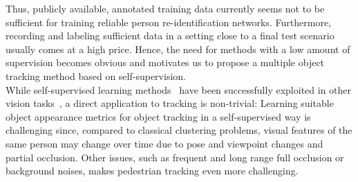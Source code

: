 Thus, publicly available, annotated training data currently seems not to be sufficient for training reliable person re-identification networks. Furthermore, recording and labeling sufficient data in a setting close to a final test scenario usually comes at a high price. Hence, the need for methods with a low amount of supervision becomes obvious and motivates us to propose a multiple object tracking method based on self-supervision.\\
While self-supervised learning methods~\cite{kolesnikov2019revisiting} have been successfully exploited in other vision tasks~\cite{watch_move,mahendran2018cross,hendrycks2019using,self_pedest,bb_annot,col_vid}, a direct application to tracking is non-trivial: Learning suitable object appearance metrics for object tracking in a self-supervised way is challenging since, compared to classical clustering problems, visual features of the same person may change over time due to pose and viewpoint changes and partial occlusion.
Other issues, such as frequent and long range full occlusion or background noises, makes pedestrian tracking even more challenging.\\


